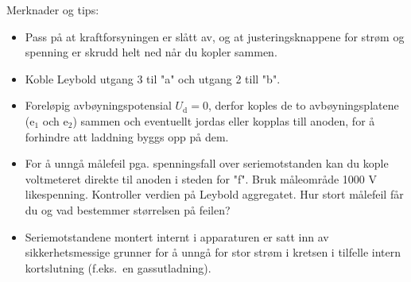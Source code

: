 \documentclass[../Elmag-labhefte-2020.tex]{subfiles}
\begin{document}
Merknader og tips:
\vspace{-4mm} 
\begin{itemize}
    \item Pass på at kraftforsyningen er slått av, og at justeringsknappene for strøm og spenning er skrudd helt ned når du kopler sammen.
    \item Koble Leybold utgang 3 til "a" och utgang 2 till "b".
    \item Foreløpig avbøyningspotensial $U_\mathrm{d} = 0$, derfor koples de to avbøyningsplatene (e$_1$ och e$_2$) sammen och eventuellt jordas eller kopplas till anoden, for å forhindre att laddning byggs opp på dem. 
    \item For å unngå målefeil pga. spenningsfall over seriemotstanden kan du kople voltmeteret direkte til anoden i steden for "f". Bruk måleområde 1000 V likespenning. Kontroller verdien på Leybold aggregatet. Hur stort målefeil får du og vad bestemmer størrelsen på feilen?
    \item Seriemotstandene montert internt i apparaturen er satt inn av sikkerhetsmessige grunner for å unngå for stor strøm i kretsen i tilfelle intern kortslutning (f.eks.\ en gassutladning). 
\end{itemize}
 








\end{document}
